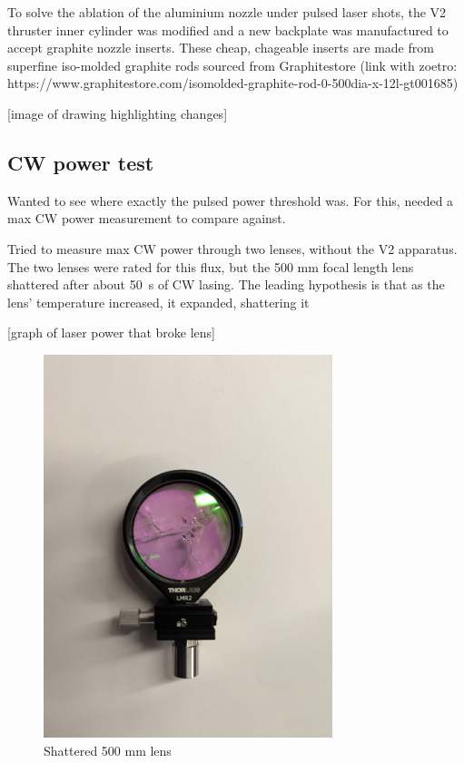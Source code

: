             To solve the ablation of the aluminium nozzle under pulsed laser shots, the V2 thruster inner cylinder was modified and a new backplate was manufactured to accept graphite nozzle inserts. These cheap, chageable inserts are made from superfine iso-molded graphite rods sourced from Graphitestore (link with zoetro: https://www.graphitestore.com/isomolded-graphite-rod-0-500dia-x-12l-gt001685)

            [image of drawing highlighting changes]

        \subsection{CW power test}

            Wanted to see where exactly the pulsed power threshold was. For this, needed a max CW power measurement to compare against. 

            Tried to measure max CW power through two lenses, without the V2 apparatus. The two lenses were rated for this flux, but the 500 mm focal length lens shattered after about \qty{50}{s} of CW lasing. The leading hypothesis is that as the lens' temperature increased, it expanded, shattering it

            [graph of laser power that broke lens]

            \begin{figure}
                \centering
                \includegraphics[width=0.75\textwidth]{assets/5 results/Shattered 500 mm lens.jpg}
                \caption{Shattered 500 mm lens}
            \end{figure}

